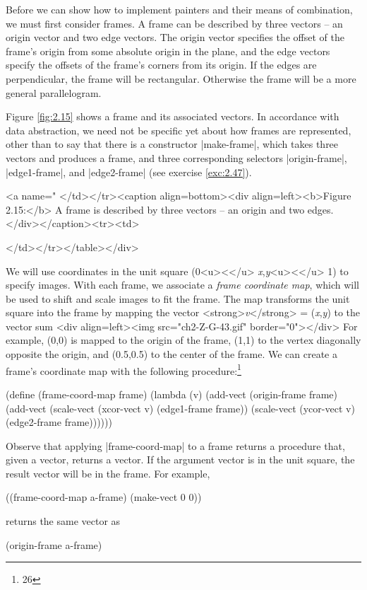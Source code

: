 \begin{Exercise}
\begin{Exercise}
\begin{Exercise}
\begin{Exercise}
\begin{Exercise}
Before we can show how to implement painters and their
means of combination, we must first consider
frames.  A frame can be described by three vectors -- an origin vector
and two edge vectors.  The origin vector specifies the offset of the
frame's origin from some absolute origin in the plane, and the edge
vectors specify the offsets of the frame's corners from its origin.
If the edges are perpendicular, the frame will be rectangular.
Otherwise the frame will be a more general parallelogram.

Figure \ref{fig:2.15} shows a frame and its associated vectors.  In
accordance with data abstraction, we need not be
specific yet about how frames are represented, other than to say that
there is a constructor \scheme|make-frame|, which takes three vectors and
produces a frame, and three corresponding selectors \scheme|origin-frame|, \scheme|edge1-frame|, and \scheme|edge2-frame| (see
exercise \ref{exc:2.47}).

<a name="%
</td></tr><caption align=bottom><div align=left><b>Figure 2.15:</b>  A frame is described by three vectors -- an
origin and two edges.</div></caption><tr><td>

</td></tr></table></div> 

We will use coordinates in the unit square (0<u><</u> \textit{x},\textit{y}<u><</u> 1)
to specify images.
With each frame, we associate a \textit{frame coordinate map}, which
will be used to shift and scale images to fit the frame.  The map
transforms the unit square into the frame by
mapping the vector <strong>\textit{v}</strong> = (\textit{x},\textit{y}) to the vector sum
<div align=left><img src="ch2-Z-G-43.gif" border="0"></div>
For example, (0,0) is mapped to the origin of the frame, (1,1) to
the vertex diagonally opposite the origin, and (0.5,0.5) to the
center of the frame.  We can create a frame's coordinate map with the
following procedure:\footnote{26}

\begin{schemedisplay}
(define (frame-coord-map frame)
  (lambda (v)
    (add-vect
     (origin-frame frame)
     (add-vect (scale-vect (xcor-vect v)
                           (edge1-frame frame))
               (scale-vect (ycor-vect v)
                           (edge2-frame frame))))))
\end{schemedisplay}
Observe that applying \scheme|frame-coord-map| to a frame returns
a procedure that, given a vector, returns a vector.
If the argument vector is in the unit square, the result vector
will be in the frame.  For example,
\begin{schemedisplay}
((frame-coord-map a-frame) (make-vect 0 0))
\end{schemedisplay}
returns the same vector as
\begin{schemedisplay}
(origin-frame a-frame)
\end{schemedisplay}


\end{Exercise}
\end{Exercise}
\end{Exercise}
\end{Exercise}
\end{Exercise}
